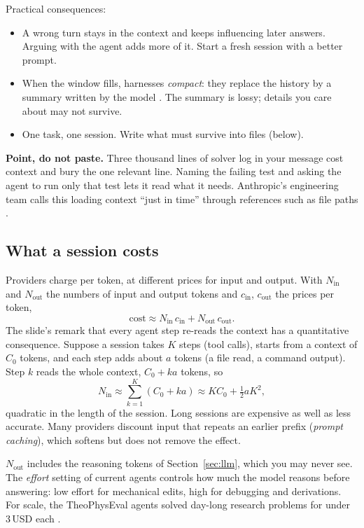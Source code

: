 Practical consequences:
\begin{itemize}
  \item A wrong turn stays in the context and keeps influencing later answers. Arguing
        with the agent adds more of it. Start a fresh session with a better prompt.
  \item When the window fills, harnesses \emph{compact}: they replace the history by a
        summary written by the model . The summary is lossy; details you
        care about may not survive.
  \item One task, one session. Write what must survive into files (below).
\end{itemize}

\textbf{Point, do not paste.} Three thousand lines of solver log in your message cost
context and bury the one relevant line. Naming the failing test and asking the agent to
run only that test lets it read what it needs. Anthropic's engineering team calls this
loading context ``just in time'' through references such as file paths .

\subsection{What a session costs}

Providers charge per token, at different prices for input and output. With $N_{\mathrm{in}}$
and $N_{\mathrm{out}}$ the numbers of input and output tokens and $c_{\mathrm{in}}$,
$c_{\mathrm{out}}$ the prices per token,
\begin{equation}
  \text{cost} \approx N_{\mathrm{in}}\, c_{\mathrm{in}} + N_{\mathrm{out}}\, c_{\mathrm{out}}.
\end{equation}
The slide's remark that every agent step re-reads the context has a quantitative
consequence. Suppose a session takes $K$ steps (tool calls), starts from a context of
$C_0$ tokens, and each step adds about $a$ tokens (a file read, a command output). Step
$k$ reads the whole context, $C_0 + k a$ tokens, so
\begin{equation}
  N_{\mathrm{in}} \approx \sum_{k=1}^{K} (C_0 + k a) \approx K C_0 + \tfrac12 a K^2 ,
\end{equation}
quadratic in the length of the session. Long sessions are expensive as well as less
accurate. Many providers discount input that repeats an earlier prefix (\emph{prompt
caching}), which softens but does not remove the effect.

$N_{\mathrm{out}}$ includes the reasoning tokens of Section~\ref{sec:llm}, which you may
never see. The \emph{effort} setting of current agents controls how much the model
reasons before answering: low effort for mechanical edits, high for debugging and
derivations. For scale, the TheoPhysEval agents solved day-long research problems for
under 3\,USD each .

